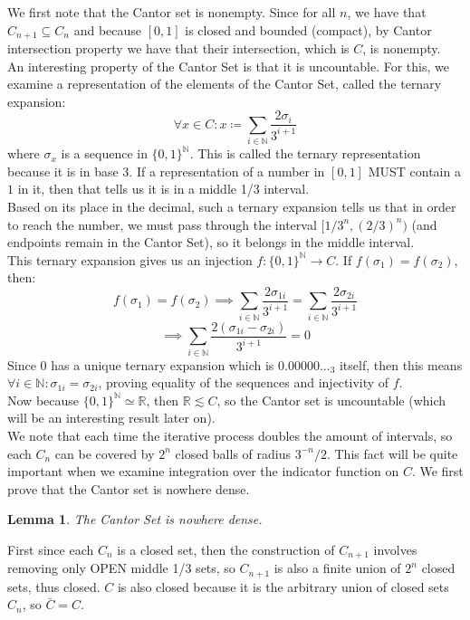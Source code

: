 \documentclass[10pt,letterpaper]{article} %
\newtheorem{lem}{Lemma}[section]
\begin{document}
We first note that the Cantor set is nonempty. Since for all $n$, we have that $C_{n+1} \subseteq C_n$ and because $[0, 1]$ is closed and bounded (compact), by Cantor intersection property we have that their intersection, which is $C$, is nonempty.\\

An interesting property of the Cantor Set is that it is uncountable. For this, we examine a representation of the elements of the Cantor Set, called the ternary expansion:
\begin{equation*}
  \forall x \in C: x \coloneq \sum_{i \in \mathbb{N}} \frac{2\sigma_i}{3^{i+1}}
\end{equation*}
where $\sigma_x$ is a sequence in $\{0, 1\}^\mathbb{N}$. This is called the ternary representation because it is in base 3. If a representation of a number in $[0, 1]$ MUST contain a $1$ in it, then that tells us it is in a middle 1/3 interval.\\

Based on its place in the decimal, such a ternary expansion tells us that in order to reach the number, we must pass through the interval $[1/3^n, (2/3)^n)$ (and endpoints remain in the Cantor Set), so it belongs in the middle interval.\\

This ternary expansion gives us an injection $f: \{0, 1\}^\mathbb{N} \xrightarrow{} C$. If $f(\sigma_1) = f(\sigma_2)$, then:
\begin{equation*}
  f(\sigma_1) = f(\sigma_2) \implies \sum_{i \in \mathbb{N}}\frac{2\sigma_{1i}}{3^{i+1}} = \sum_{i \in \mathbb{N}}\frac{2\sigma_{2i}}{3^{i+1}}
\end{equation*}
\begin{equation*}
  \implies \sum_{i \in \mathbb{N}}\frac{2(\sigma_{1i} - \sigma_{2i})}{3^{i+1}} = 0
\end{equation*}
Since $0$ has a unique ternary expansion which is $0.00000..._3$ itself, then this means $\forall i \in \mathbb{N}: \sigma_{1i} = \sigma_{2i}$, proving equality of the sequences and injectivity of $f$.\\

Now because $\{0, 1\}^\mathbb{N} \simeq \mathbb{R}$, then $\mathbb{R} \lesssim C$, so the Cantor set is uncountable (which will be an interesting result later on).\\

We note that each time the iterative process doubles the amount of intervals, so each $C_n$ can be covered by $2^n$ closed balls of radius $3^{-n}/2$. This fact will be quite important when we examine integration over the indicator function on $C$. We first prove that the Cantor set is nowhere dense. 
\begin{lem}
The Cantor Set is nowhere dense.
\end{lem}
First since each $C_n$ is a closed set, then the construction of $C_{n+1}$ involves removing only OPEN middle 1/3 sets, so $C_{n+1}$ is also a finite union of $2^n$ closed sets, thus closed. $C$ is also closed because it is the arbitrary union of closed sets $C_n$, so $\bar{C} = C$.\\
\end{document}
